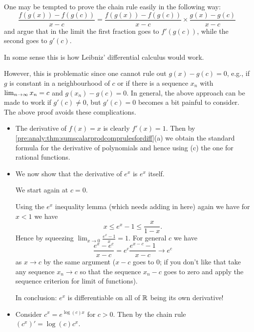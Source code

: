 \documentclass[10pt, a4paper]{article}
\begin{document}
\begin{remark}
    One may be tempted to prove the chain rule easily in the following way:
    \[
    \frac{f(g(x)) - f(g(c))}{x - c} = \frac{f(g(x)) - f(g(c))}{x - c} \times \frac{g(x) - g(c)}{x - c}
    \]
    and argue that in the limit the first fraction goes to $f'(g(c))$,
    while the second goes to $g'(c)$.

    In some sense this is how Leibniz' differential calculus would work.


    However,
    this is problematic since one cannot rule out $g(x) - g(c) = 0$,
    e.g.,
    if $g$ is constant in a neighbourhood of $c$ or if there is a sequence $x_n$ with $\lim_{n \rightarrow \infty} x_n = c$ and $g(x_n) - g(c) = 0$.
    In general,
    the above approach can be made to work if $g'(c) \neq 0$,
    but $g'(c) = 0$ becomes a bit painful to consider.
    The above proof avoids these complications.
\end{remark}

\begin{example}
    \begin{itemize}
        \item The derivative of $f(x) = x$ is clearly $f'(x) = 1$.
        Then by \autoref{pre:analy:thm:sumscalarprodcomprulesfordiff}(a) we obtain the standard formula for the derivative of polynomials and hence using (c) the one for rational functions.

        \item We now show that the derivative of $e ^ x$ is $e ^ x$ itself.

        We start again at $c = 0$.

        Using the $e ^ x$ inequality lemma
        (which needs adding in here)
        again we have for $x < 1$ we have
        \[
        x \leq e ^ x - 1 \leq \frac{x}{1 - x}.
        \]
        Hence by squeezing $\lim_{x \rightarrow 0}\frac{e ^ x - 1}{x} = 1$.
        For general $c$ we have
        \[
        \frac{e ^ x - e ^ c}{x - c} = e ^ c\frac{e ^ {x - c} - 1}{x - c} \rightarrow e ^ c
        \]
        as $x \rightarrow c$ by the same argument
        ($x - c$ goes to $0$;
        if you don't like that take any sequence $x_n \rightarrow c$ so that the sequence $x_n - c$ goes to zero and apply the sequence criterion for limit of functions).

        In conclusion:
        $e ^ x$ is differentiable on all of $\mathbb{R}$ being its own derivative!

        \item Consider $c ^ x = e ^ {\log(c)x}$ for $c > 0$.
        Then by the chain rule $(c ^ x)' = \log(c)c ^ x$.
    \end{itemize}
\end{example}
\end{document}
